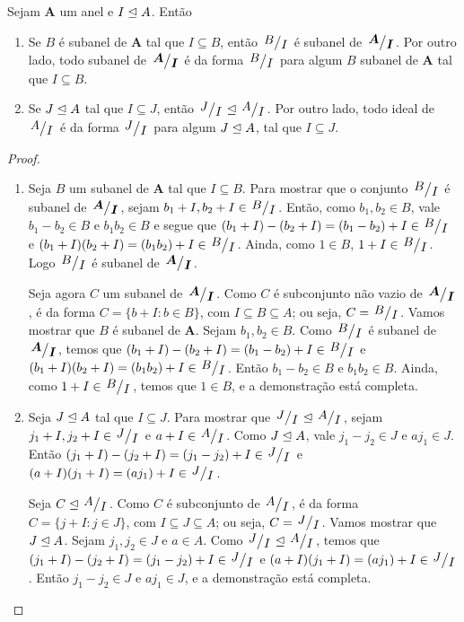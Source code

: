 \begin{lema}
	Sejam $\bm A$ um anel e $I \mathrel{\unlhd} A$. Então
	\begin{enumerate}
	\item Se $B$ é subanel de $\bm A$ tal que $I \subseteq B$, então $\quo{B}{I}$ é subanel de $\bm{\quo{A}{I}}$. Por outro lado, todo subanel de $\bm{\quo{A}{I}}$ é da forma $\quo{B}{I}$ para algum $B$ subanel de $\bm A$ tal que $I \subseteq B$.
	\item Se $J \mathrel{\unlhd} A$ tal que $I \subseteq J$, então $\quo{J}{I} \ide \quo{A}{I}$. Por outro lado, todo ideal de $\quo{A}{I}$ é da forma $\quo{J}{I}$ para algum $J \mathrel{\unlhd} A$, tal que $I \subseteq J$.
	\end{enumerate}
\end{lema}
\begin{proof}
	\begin{enumerate}
	\item Seja $B$ um subanel de $\bm A$ tal que $I \subseteq B$. Para mostrar que o conjunto $\quo{B}{I}$ é subanel de $\bm{\quo{A}{I}}$, sejam $b_1+I,b_2+I \in \quo{B}{I}$. Então, como $b_1,b_2 \in B$, vale $b_1-b_2 \in B$ e $b_1b_2 \in B$ e segue que $(b_1+I)-(b_2+I)=(b_1-b_2)+I \in \quo{B}{I}$ e $(b_1+I)(b_2+I)=(b_1b_2)+I \in \quo{B}{I}$. Ainda, como $1 \in B$, $1+I \in \quo{B}{I}$. Logo $\quo{B}{I}$ é subanel de $\bm{\quo{A}{I}}$.

	Seja agora $C$ um subanel de $\bm{\quo{A}{I}}$. Como $C$ é subconjunto não vazio de $\bm{\quo{A}{I}}$, é da forma $C=\{b + I : b \in B\}$, com $I \subseteq B \subseteq A$; ou seja, $C=\quo{B}{I}$. Vamos mostrar que $B$ é subanel de $\bm A$. Sejam $b_1,b_2 \in B$. Como $\quo{B}{I}$ é subanel de $\bm{\quo{A}{I}}$, temos que $(b_1+I)-(b_2+I)=(b_1-b_2)+I \in \quo{B}{I}$ e $(b_1+I)(b_2+I)=(b_1b_2)+I \in \quo{B}{I}$. Então $b_1-b_2 \in B$ e $b_1b_2 \in B$. Ainda, como $1+I \in \quo{B}{I}$, temos que $1 \in B$, e a demonstração está completa.

	\item Seja $J \mathrel{\unlhd} A$ tal que $I \subseteq J$. Para mostrar que $\quo{J}{I} \ide \quo{A}{I}$, sejam $j_1+I,j_2+I \in \quo{J}{I}$ e $a+I \in \quo{A}{I}$. Como $J \mathrel{\unlhd} A$, vale $j_1-j_2 \in J$ e $aj_1 \in J$. Então $(j_1+I)-(j_2+I)=(j_1-j_2)+I \in \quo{J}{I}$ e $(a+I)(j_1+I)=(aj_1)+I \in \quo{J}{I}$.

	Seja $C \ide \quo{A}{I}$. Como $C$ é subconjunto de $\quo{A}{I}$, é da forma $C=\{j+I : j \in J\}$, com $I \subseteq J \subseteq A$; ou seja, $C=\quo{J}{I}$. Vamos mostrar que $J \mathrel{\unlhd} A$. Sejam $j_1,j_2 \in J$ e $a \in A$. Como $\quo{J}{I} \ide \quo{A}{I}$, temos que $(j_1+I)-(j_2+I)=(j_1-j_2)+I \in \quo{J}{I}$ e $(a+I)(j_1+I)=(aj_1)+I \in \quo{J}{I}$. Então $j_1-j_2 \in J$ e $aj_1 \in J$, e a demonstração está completa.
	\end{enumerate}
\end{proof}

